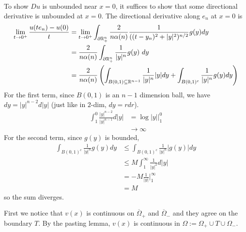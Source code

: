 \documentclass[12pt]{article}
\begin{document}
\begin{problem}[3]
\begin{problem}[4]
To show $ Du$ is unbounded near  $ x=0$, it suffices to show that some directional derivative is unbounded at $ x=0$. The directional derivative along $ e_n$ at $ x=0$ is
\begin{align*}
	\lim_{ t \to 0^{+}} \frac{u(te_n)-u(0)}{ t}&= \lim_{ t \to 0^{+}} \int_{\partial \rr_+^{n}} \frac{2}{n \alpha(n)} \frac{1}{((t-y_n)^2+ |y|^2)^{n /2 }} g(y) dy\\
	&= \frac{2}{n \alpha(n)} \int_{ \partial \rr_+^{n}} \frac{1}{ |y|^{n}} g(y)\ dy\\
	&= \frac{2}{n \alpha(n)} \left(\int_{B(0,1) \subseteq \rr^{n-1}} \frac{1}{|y|^{n}} |y| dy + \int_{B(0,1)^{c}} \frac{1}{|y|^{n}}g(y) dy \right) 
\end{align*}
For the first term, since $ B(0,1)$ is an  $ n-1$ dimension ball, we have $dy = |y|^{n-2} d|y| $ (just like in $ 2$-dim,  $dy = rdr $). 
\begin{align*}
	\int_{1}^{0} \frac{|y|^{n-2}}{|y|^{n-1}} d|y| &= \log |y| \bigg|_1^0 \\
	&\to \infty 
\end{align*}
For the second term, since $ g(y)$ is bounded, 
\begin{align*}
	\int_{B(0,1)^{c}} \frac{1}{|y|^{n}} g(y) dy &\leq \int_{B(0,1)^{c}} \frac{1}{|y|^{n}} |g(y)| dy \\
	&\leq M \int_{1}^\infty \frac{1}{|y|^2} d|y|   \\
	&= -M  \frac{1}{|y|}\bigg|_1^{\infty} \\
	&= M 
\end{align*}
so the sum diverges.
\end{problem}
\newpage
\begin{problem}[5]
First we notice that $v(x)$ is continuous on $ \overline{\Omega}_+$ and $ \overline{\Omega}_{-}$ and they agree on the boundary $ T$. By the pasting lemma,  $ v(x)$ is continuous in  $ \Omega:= \Omega_+ \cup T \cup \Omega_{-}$.


\end{problem}
\end{problem}
\end{document}
